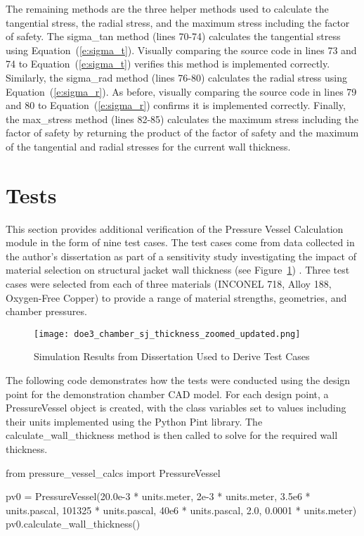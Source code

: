\documentclass{article}
\begin{document}
The remaining methods are the three helper methods used to calculate the tangential stress, the radial stress, and the maximum stress including the factor of safety.  The sigma\_tan method (lines 70-74) calculates the tangential stress using Equation~(\ref{e:sigma_t}).  Visually comparing the source code in lines 73 and 74 to Equation~(\ref{e:sigma_t}) verifies this method is implemented correctly.  Similarly, the sigma\_rad method (lines 76-80) calculates the radial stress using Equation~(\ref{e:sigma_r}).  As before, visually comparing the source code in lines 79 and 80 to Equation~(\ref{e:sigma_r}) confirms it is implemented correctly.  Finally, the max\_stress method (lines 82-85) calculates the maximum stress including the factor of safety by returning the product of the factor of safety and the maximum of the tangential and radial stresses for the current wall thickness.

\section{Tests}
This section provides additional verification of the Pressure Vessel Calculation module in the form of nine test cases.  The test cases come from data collected in the author's dissertation as part of a sensitivity study investigating the impact of material selection on structural jacket wall thickness (see Figure~\ref{f:doe3_thickness_plot}) \cite{Simmons2014}.  Three test cases were selected from each of three materials (INCONEL 718, Alloy 188, Oxygen-Free Copper) to provide a range of material strengths, geometries, and chamber pressures.

\begin{figure}[!ht]
  \begin{center}
  \texttt{[image: doe3\_chamber\_sj\_thickness\_zoomed\_updated.png]} 
  \caption{Simulation Results from Dissertation Used to Derive Test Cases \cite{Simmons2014}}
  \label{f:doe3_thickness_plot}
  \end{center}
\end{figure}

The following code demonstrates how the tests were conducted using the design point for the demonstration chamber CAD model.  For each design point, a PressureVessel object is created, with the class variables set to values including their units implemented using the Python Pint library.  The calculate\_wall\_thickness method is then called to solve for the required wall thickness.

\begin{sageblock}
from pressure_vessel_calcs import PressureVessel

pv0 = PressureVessel(20.0e-3 * units.meter,
                     2e-3 * units.meter,
                     3.5e6 * units.pascal,
                     101325 * units.pascal,
                     40e6 * units.pascal,
                     2.0,
                     0.0001 * units.meter)
pv0.calculate_wall_thickness()
\end{sageblock}
\end{document}
